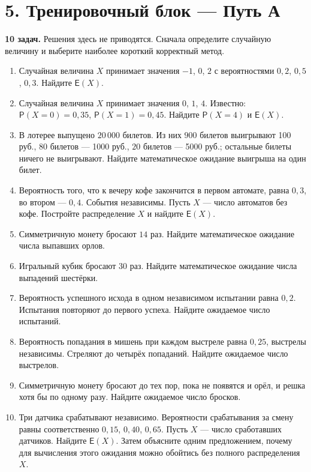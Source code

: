\documentclass[a4paper,12pt]{article}
\newcommand{\E}{\mathsf{E}}
\newcommand{\Prb}{\mathsf{P}}
\newcommand{\sectionline}{\par\vspace{0.2em}{\color{accent}\hrule height 0.6pt}\vspace{0.5em}}
\begin{document}
\clearpage

\section*{5. Тренировочный блок --- Путь А}
\sectionline

\textbf{10 задач.} Решения здесь не приводятся. Сначала определите случайную величину и выберите наиболее короткий корректный метод.

\begin{enumerate}
  \item Случайная величина $X$ принимает значения $-1$, $0$, $2$ с вероятностями $0{,}2$, $0{,}5$, $0{,}3$. Найдите $\E(X)$.

  \item Случайная величина $X$ принимает значения $0$, $1$, $4$. Известно: $\Prb(X=0)=0{,}35$, $\Prb(X=1)=0{,}45$. Найдите $\Prb(X=4)$ и $\E(X)$.

  \item В лотерее выпущено $20\,000$ билетов. Из них $900$ билетов выигрывают 100 руб., $80$ билетов --- 1000 руб., $20$ билетов --- 5000 руб.; остальные билеты ничего не выигрывают. Найдите математическое ожидание выигрыша на один билет.

  \item Вероятность того, что к вечеру кофе закончится в первом автомате, равна $0{,}3$, во втором --- $0{,}4$. События независимы. Пусть $X$ --- число автоматов без кофе. Постройте распределение $X$ и найдите $\E(X)$.

  \item Симметричную монету бросают $14$ раз. Найдите математическое ожидание числа выпавших орлов.

  \item Игральный кубик бросают $30$ раз. Найдите математическое ожидание числа выпадений шестёрки.

  \item Вероятность успешного исхода в одном независимом испытании равна $0{,}2$. Испытания повторяют до первого успеха. Найдите ожидаемое число испытаний.

  \item Вероятность попадания в мишень при каждом выстреле равна $0{,}25$, выстрелы независимы. Стреляют до четырёх попаданий. Найдите ожидаемое число выстрелов.

  \item Симметричную монету бросают до тех пор, пока не появятся и орёл, и решка хотя бы по одному разу. Найдите ожидаемое число бросков.

  \item Три датчика срабатывают независимо. Вероятности срабатывания за смену равны соответственно $0{,}15$, $0{,}40$, $0{,}65$. Пусть $X$ --- число сработавших датчиков. Найдите $\E(X)$. Затем объясните одним предложением, почему для вычисления этого ожидания можно обойтись без полного распределения $X$.
\end{enumerate}
\end{document}
